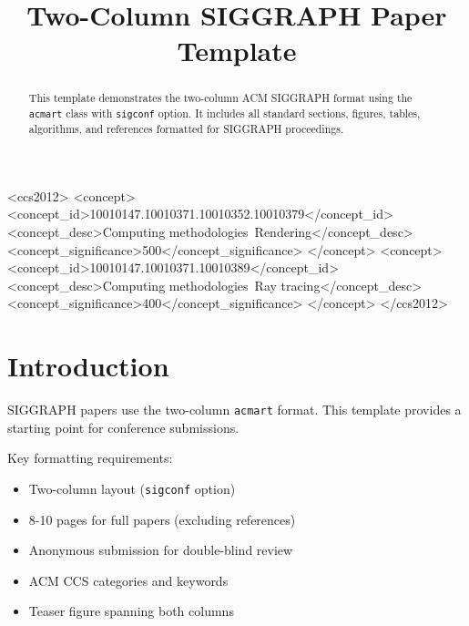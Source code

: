 \documentclass[sigconf,review,anonymous]{acmart}
\title{Two-Column SIGGRAPH Paper Template}
\begin{document}
\maketitle

\begin{abstract}
This template demonstrates the two-column ACM SIGGRAPH format
using the \texttt{acmart} class with \texttt{sigconf} option.
It includes all standard sections, figures, tables, algorithms,
and references formatted for SIGGRAPH proceedings.
\end{abstract}

\begin{CCSXML}
<ccs2012>
<concept>
<concept_id>10010147.10010371.10010352.10010379</concept_id>
<concept_desc>Computing methodologies~Rendering</concept_desc>
<concept_significance>500</concept_significance>
</concept>
<concept>
<concept_id>10010147.10010371.10010389</concept_id>
<concept_desc>Computing methodologies~Ray tracing</concept_desc>
<concept_significance>400</concept_significance>
</concept>
</ccs2012>
\end{CCSXML}



\begin{teaserfigure}
\centering
{}
\caption{Teaser figure showing main result. This spans both columns
using the \texttt{teaserfigure} environment.}\label{fig:teaser}
\end{teaserfigure}

\section{Introduction}
\label{sec:intro}

SIGGRAPH papers use the two-column \texttt{acmart} format.
This template provides a starting point for conference submissions.

Key formatting requirements:
\begin{itemize}
    \item Two-column layout (\texttt{sigconf} option)
    \item 8-10 pages for full papers (excluding references)
    \item Anonymous submission for double-blind review
    \item ACM CCS categories and keywords
    \item Teaser figure spanning both columns
\end{itemize}
\end{document}
